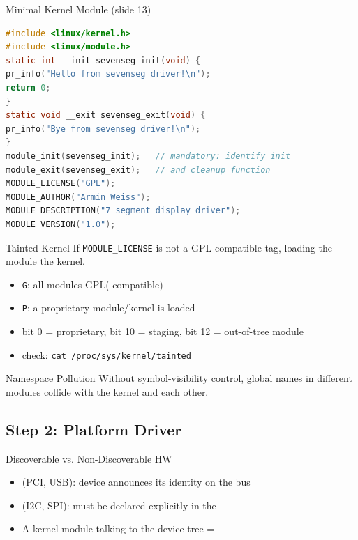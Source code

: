 \multend

\begin{examplecode}{Minimal Kernel Module (slide 13)}
\begin{lstlisting}[language=C, style=basesmol, aboveskip=2pt, belowskip=2pt]
#include <linux/kernel.h>
#include <linux/module.h>
static int __init sevenseg_init(void) {
pr_info("Hello from sevenseg driver!\n");
return 0;
}
static void __exit sevenseg_exit(void) {
pr_info("Bye from sevenseg driver!\n");
}
module_init(sevenseg_init);   // mandatory: identify init
module_exit(sevenseg_exit);   // and cleanup function
MODULE_LICENSE("GPL");
MODULE_AUTHOR("Armin Weiss");
MODULE_DESCRIPTION("7 segment display driver");
MODULE_VERSION("1.0");
\end{lstlisting}
\end{examplecode}


\begin{corollary}{Tainted Kernel}
    If \texttt{MODULE\_LICENSE} is not a GPL-compatible tag, loading the module
     the kernel.
    \begin{itemize}
        \item \texttt{G}: all modules GPL(-compatible)
        \item \texttt{P}: a proprietary module/kernel is loaded
        \item bit 0 = proprietary, bit 10 = staging, bit 12 = out-of-tree module
        \item check: \texttt{cat /proc/sys/kernel/tainted}
    \end{itemize}
\end{corollary}

\begin{corollary}{Namespace Pollution}
    Without symbol-visibility control, global names in different modules collide
    with the kernel and each other.
\end{corollary}

\multend

\subsection{Step 2: Platform Driver}

\begin{concept}{Discoverable vs. Non-Discoverable HW}
    \begin{itemize}
        \item {} (PCI, USB): device announces its identity on
              the bus
        \item {} (I2C, SPI): must be declared explicitly in
              the 
        \item A kernel module talking to the device tree = 
    \end{itemize}
\end{concept}

